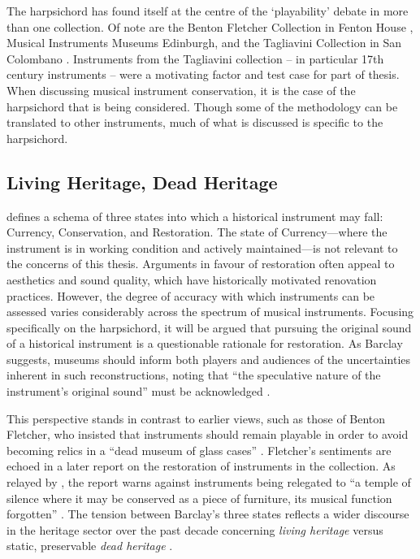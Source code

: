 The harpsichord has found itself at the centre of the `playability' debate in
more than one collection. Of note are the Benton Fletcher Collection in Fenton
House \cite{barclay_preservation_2005, mcalpine_sampling_2014}, Musical
Instruments Museums Edinburgh, and the Tagliavini Collection in San Colombano
\cite{wraight_report_2022}. Instruments from the Tagliavini collection
\cite{meer_collezione_2007} -- in particular 17th century instruments -- were a
motivating factor and test case for part of thesis. When discussing musical
instrument conservation, it is the case of the harpsichord that is being
considered. Though some of the methodology can be translated to other
instruments, much of what is discussed is specific to the harpsichord.

\subsection{Living Heritage, Dead Heritage}

\textcite[p. 19]{barclay_preservation_2005} defines a schema of three states
into which a historical instrument may fall: Currency, Conservation, and
Restoration. The state of Currency---where the instrument is in working
condition and actively maintained---is not relevant to the concerns of this
thesis. Arguments in favour of restoration often appeal to aesthetics and sound
quality, which have historically motivated renovation practices. However, the
degree of accuracy with which instruments can be assessed varies considerably
across the spectrum of musical instruments. Focusing specifically on the
harpsichord, it will be argued that pursuing the original sound of a historical
instrument is a questionable rationale for restoration. As Barclay suggests,
museums should inform both players and audiences of the uncertainties inherent
in such reconstructions, noting that ``the speculative nature of the
instrument’s original sound'' must be acknowledged \cite[p.
83]{barclay_care_1997}.

This perspective stands in contrast to earlier views, such as those of Benton
Fletcher, who insisted that instruments should remain playable in order to avoid
becoming relics in a ``dead museum of glass cases'' \cite[p. 154, quoted in a
letter]{barclay_preservation_2005}. Fletcher’s sentiments are echoed in a later
report on the restoration of instruments in the collection. As relayed by
\textcite[]{barclay_critical_1999}, the report warns against instruments being
relegated to ``a temple of silence where it may be conserved as a piece of
furniture, its musical function forgotten'' \cite{adlam_proposal_1972}. The
tension between Barclay’s three states reflects a wider discourse in the
heritage sector over the past decade concerning \emph{living heritage} versus
static, preservable \emph{dead heritage} \cite{poulios_moving_2010,
smith_uses_2006}.

